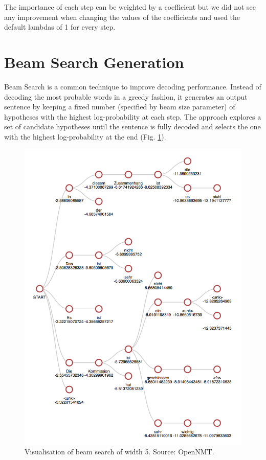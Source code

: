 The importance of each step can be weighted by a coefficient but we did not see any improvement when changing the values of the coefficients and used the default lambdas of 1 for every step.

\section{Beam Search Generation}

Beam Search is a common technique to improve decoding performance. Instead of decoding the most probable words in a greedy fashion, it generates an output sentence by keeping a fixed number (specified by beam size parameter) of hypotheses with the highest log-probability at each step. The approach explores a set of candidate hypotheses until the sentence is fully decoded and selects the one with the highest log-probability at the end (Fig. \ref{fig:beam-search}).

\begin{figure}
    \centering
    \includegraphics[width=14cm]{Images/beam_search.png}
    \caption{Visualisation of beam search of width 5. Source: OpenNMT.}
    \label{fig:beam-search}
\end{figure}

